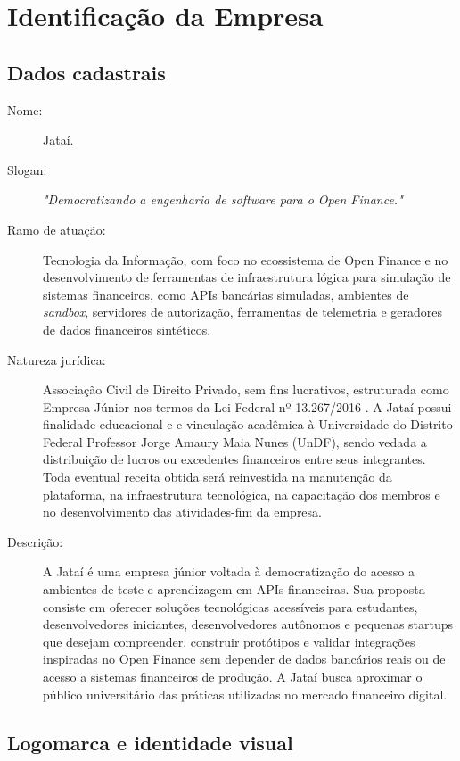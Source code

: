 \documentclass[
  12pt,
  openright,
  oneside,
  a4paper,
  brazilian
]{abntex2}
\newcommand{\instituicaoNome}{Universidade do Distrito Federal Professor Jorge Amaury Maia Nunes}
\newcommand{\instituicaoSigla}{UnDF}
\begin{document}
\chapter{Identificação da Empresa}
\label{cap:identificacao_empresa}

\section{Dados cadastrais}
\label{sec:dados_cadastrais}

\begin{description}
  \item[Nome:] Jataí.
  \item[Slogan:] \textit{"Democratizando a engenharia de software para o Open Finance."}
  \item[Ramo de atuação:] Tecnologia da Informação, com foco no ecossistema de Open Finance e no desenvolvimento de ferramentas de infraestrutura lógica para simulação de sistemas financeiros, como APIs bancárias simuladas, ambientes de \textit{sandbox}, servidores de autorização, ferramentas de telemetria e geradores de dados financeiros sintéticos.
  \item[Natureza jurídica:] Associação Civil de Direito Privado, sem fins lucrativos, estruturada como Empresa Júnior nos termos da Lei Federal nº 13.267/2016 \cite{brasil2016empresa}. A Jataí possui finalidade educacional e e vinculação acadêmica à \instituicaoNome{} (\instituicaoSigla), sendo vedada a distribuição de lucros ou excedentes financeiros entre seus integrantes. Toda eventual receita obtida será reinvestida na manutenção da plataforma, na infraestrutura tecnológica, na capacitação dos membros e no desenvolvimento das atividades-fim da empresa.
  \item[Descrição:] A Jataí é uma empresa júnior voltada à democratização do acesso a ambientes de teste e aprendizagem em APIs financeiras. Sua proposta consiste em oferecer soluções tecnológicas acessíveis para estudantes, desenvolvedores iniciantes, desenvolvedores autônomos e pequenas startups que desejam compreender, construir protótipos e validar integrações inspiradas no Open Finance sem depender de dados bancários reais ou de acesso a sistemas financeiros de produção. A Jataí busca aproximar o público universitário das práticas utilizadas no mercado financeiro digital.
\end{description}

\section{Logomarca e identidade visual}
\label{sec:logomarca}
\end{document}

